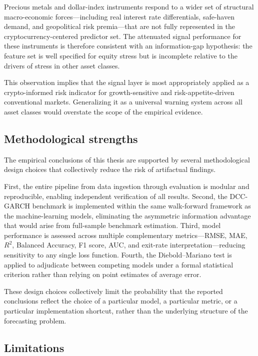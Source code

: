 Precious metals and dollar-index instruments respond to a wider set of structural macro-economic forces---including real interest rate differentials, safe-haven demand, and geopolitical risk premia---that are not fully represented in the cryptocurrency-centered predictor set. The attenuated signal performance for these instruments is therefore consistent with an information-gap hypothesis: the feature set is well specified for equity stress but is incomplete relative to the drivers of stress in other asset classes.

This observation implies that the signal layer is most appropriately applied as a crypto-informed risk indicator for growth-sensitive and risk-appetite-driven conventional markets. Generalizing it as a universal warning system across all asset classes would overstate the scope of the empirical evidence.

\subsection{Methodological strengths}

The empirical conclusions of this thesis are supported by several methodological design choices that collectively reduce the risk of artifactual findings.

First, the entire pipeline from data ingestion through evaluation is modular and reproducible, enabling independent verification of all results. Second, the DCC-GARCH benchmark is implemented within the same walk-forward framework as the machine-learning models, eliminating the asymmetric information advantage that would arise from full-sample benchmark estimation. Third, model performance is assessed across multiple complementary metrics---RMSE, MAE, $R^2$, Balanced Accuracy, F1 score, AUC, and exit-rate interpretation---reducing sensitivity to any single loss function. Fourth, the Diebold--Mariano test is applied to adjudicate between competing models under a formal statistical criterion rather than relying on point estimates of average error.

These design choices collectively limit the probability that the reported conclusions reflect the choice of a particular model, a particular metric, or a particular implementation shortcut, rather than the underlying structure of the forecasting problem.

\subsection{Limitations}

